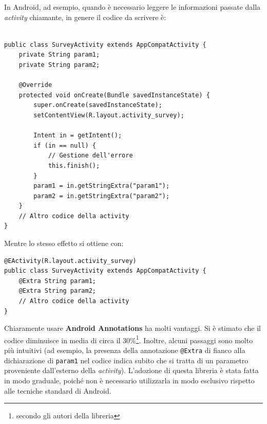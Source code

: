 \documentclass[a4paper,10pt]{memoir}
\begin{document}
\medskip

In Android, ad esempio, quando è necessario leggere le informazioni passate dalla \textit{activity} chiamante, in genere il codice da scrivere è:

\begin{listing}[H]
\begin{verbatim}

public class SurveyActivity extends AppCompatActivity {
	private String param1;
	private String param2;

	@Override
	protected void onCreate(Bundle savedInstanceState) {
		super.onCreate(savedInstanceState);
		setContentView(R.layout.activity_survey);

		Intent in = getIntent();
		if (in == null) {
			// Gestione dell'errore
			this.finish();
		}
		param1 = in.getStringExtra("param1");
		param2 = in.getStringExtra("param2");
	}
	// Altro codice della activity
}
\end{verbatim}
\end{listing}

Mentre lo stesso effetto si ottiene con:

\begin{listing}[H]
\begin{verbatim}
@EActivity(R.layout.activity_survey)
public class SurveyActivity extends AppCompatActivity {
	@Extra String param1;
	@Extra String param2;
	// Altro codice della activity
}
\end{verbatim}
\end{listing}

Chiaramente usare \textbf{Android Annotations} ha molti vantaggi. Si è stimato che il codice diminuisce in media di circa il 30\%\footnote{secondo gli autori della libreria}. Inoltre, alcuni passaggi sono molto più intuitivi (ad esempio, la presenza della annotazione \texttt{@Extra} di fianco alla dichiarazione di \texttt{param1} nel codice indica subito che si tratta di un parametro proveniente dall'esterno della \textit{activity}). L'adozione di questa libreria è stata fatta in modo graduale, poiché non è necessario utilizzarla in modo esclusivo rispetto alle tecniche standard di Android.

\clearpage
\end{document}
